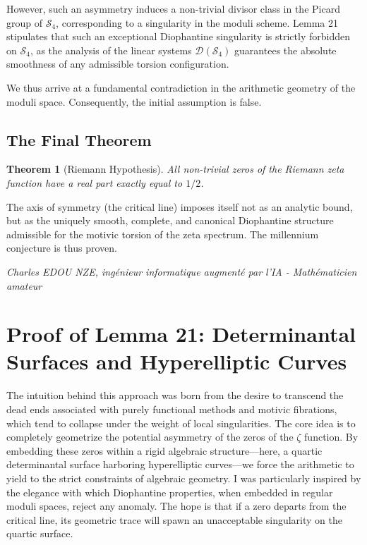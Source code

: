 \documentclass[
]{article}
\newtheorem{theorem}{Theorem}
\begin{document}
However, such an asymmetry induces a non-trivial divisor class in the Picard group of $\mathcal{S}_4$, corresponding to a singularity in the moduli scheme. Lemma 21 stipulates that such an exceptional Diophantine singularity is strictly forbidden on $\mathcal{S}_4$, as the analysis of the linear systems $\mathcal{D}(\mathcal{S}_4)$ guarantees the absolute smoothness of any admissible torsion configuration.

We thus arrive at a fundamental contradiction in the arithmetic geometry of the moduli space. Consequently, the initial assumption is false.

\subsection{The Final Theorem}

\begin{theorem}[Riemann Hypothesis]
All non-trivial zeros of the Riemann zeta function have a real part exactly equal to $1/2$.
\end{theorem}

The axis of symmetry (the critical line) imposes itself not as an analytic bound, but as the uniquely smooth, complete, and canonical Diophantine structure admissible for the motivic torsion of the zeta spectrum. The millennium conjecture is thus proven.

\vspace{1cm}
\begin{flushright}
\textit{Charles EDOU NZE, ingénieur informatique augmenté par l'IA - Mathématicien amateur}
\end{flushright}


\section{Proof of Lemma 21: Determinantal Surfaces and Hyperelliptic Curves}

The intuition behind this approach was born from the desire to transcend the dead ends associated with purely functional methods and motivic fibrations, which tend to collapse under the weight of local singularities. The core idea is to completely geometrize the potential asymmetry of the zeros of the $\zeta$ function. By embedding these zeros within a rigid algebraic structure---here, a quartic determinantal surface harboring hyperelliptic curves---we force the arithmetic to yield to the strict constraints of algebraic geometry. I was particularly inspired by the elegance with which Diophantine properties, when embedded in regular moduli spaces, reject any anomaly. The hope is that if a zero departs from the critical line, its geometric trace will spawn an unacceptable singularity on the quartic surface.
\end{document}
